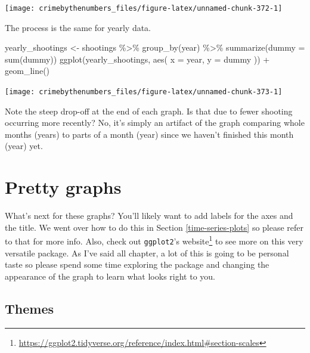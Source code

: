 \documentclass[
  a4paper,
]{krantz}
\makeatletter
\newenvironment{Shaded}{\begin{snugshade}}{\end{snugshade}}
\newcommand{\AttributeTok}[1]{\textcolor[rgb]{0.61,0.61,0.61}{#1}}
\newcommand{\FunctionTok}[1]{\textcolor[rgb]{0,0,0}{#1}}
\newcommand{\NormalTok}[1]{#1}
\newcommand{\OtherTok}[1]{\textcolor[rgb]{0.37,0.37,0.37}{#1}}
\newcommand{\SpecialCharTok}[1]{\textcolor[rgb]{0,0,0}{#1}}
\renewcommand{\href}[2]{#2\footnote{\url{#1}}}
\newenvironment{kframe}{%
\medskip{}
\setlength{\fboxsep}{.8em}
 \def\at@end@of@kframe{}%
 \ifinner\ifhmode%
  \def\at@end@of@kframe{\end{minipage}}%
  \begin{minipage}{\columnwidth}%
 \fi\fi%
 \def\FrameCommand##1{\hskip\@totalleftmargin \hskip-\fboxsep
 \colorbox{shadecolor}{##1}\hskip-\fboxsep
     \hskip-\linewidth \hskip-\@totalleftmargin \hskip\columnwidth}%
 \MakeFramed {\advance\hsize-\width
   \@totalleftmargin\z@ \linewidth\hsize
   \@setminipage}}%
 {\par\unskip\endMakeFramed%
 \at@end@of@kframe}
\renewenvironment{Shaded}{\begin{kframe}}{\end{kframe}}
\makeatother
\begin{document}
\begin{center}\texttt{[image: crimebythenumbers\_files/figure-latex/unnamed-chunk-372-1]} \end{center}

The process is the same for yearly data.

\begin{Shaded}
\begin{Highlighting}[]
\NormalTok{yearly\_shootings }\OtherTok{\textless{}{-}}\NormalTok{ shootings }\SpecialCharTok{\%\textgreater{}\%}
  \FunctionTok{group\_by}\NormalTok{(year) }\SpecialCharTok{\%\textgreater{}\%}
  \FunctionTok{summarize}\NormalTok{(}\AttributeTok{dummy =} \FunctionTok{sum}\NormalTok{(dummy))}
\FunctionTok{ggplot}\NormalTok{(yearly\_shootings, }\FunctionTok{aes}\NormalTok{(}
  \AttributeTok{x =}\NormalTok{ year,}
  \AttributeTok{y =}\NormalTok{ dummy}
\NormalTok{)) }\SpecialCharTok{+}
  \FunctionTok{geom\_line}\NormalTok{()}
\end{Highlighting}
\end{Shaded}

\begin{center}\texttt{[image: crimebythenumbers\_files/figure-latex/unnamed-chunk-373-1]} \end{center}

Note the steep drop-off at the end of each graph. Is that
due to fewer shooting occurring more recently? No, it's
simply an artifact of the graph comparing whole months
(years) to parts of a month (year) since we haven't finished
this month (year) yet.

\hypertarget{pretty-graphs}{%
\section{Pretty graphs}\label{pretty-graphs}}

What's next for these graphs? You'll likely want to add
labels for the axes and the title. We went over how to do
this in Section \ref{time-series-plots} so please refer to
that for more info. Also, check out \texttt{ggplot2}'s
\href{https://ggplot2.tidyverse.org/reference/index.html\#section-scales}{website}
to see more on this very versatile package. As I've said all
chapter, a lot of this is going to be personal taste so
please spend some time exploring the package and changing
the appearance of the graph to learn what looks right to
you.

\hypertarget{themes}{%
\subsection{Themes}\label{themes}}
\end{document}
